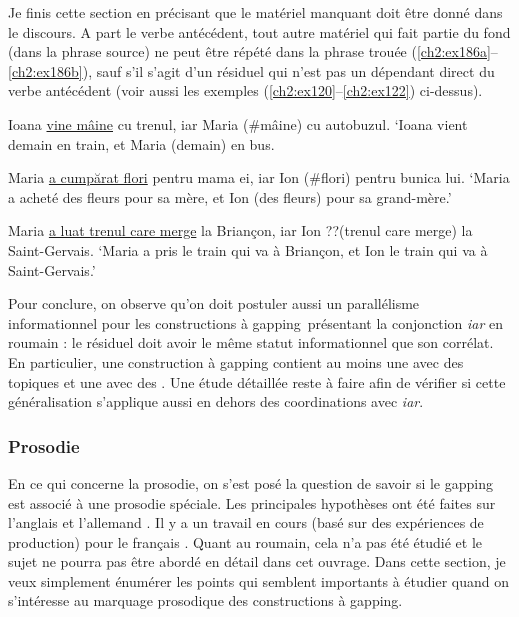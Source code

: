 Je finis cette section en précisant que le matériel manquant doit être donné dans le discours. A part le verbe antécédent, tout autre matériel qui fait partie du fond (dans la phrase source) ne peut être répété dans la phrase trouée (\ref{ch2:ex186a}--\ref{ch2:ex186b}), sauf s’il s’agit d’un résiduel qui n’est pas un dépendant direct du verbe antécédent  (voir aussi les exemples (\ref{ch2:ex120}--\ref{ch2:ex122}) ci-dessus). 

\ea
\ea Ioana \uline{vine mâine} cu trenul, iar Maria (\#mâine) cu autobuzul. \label{ch2:ex186a}
\glt ‘Ioana vient demain en train, et Maria (demain) en bus. 

\ex Maria \uline{a cumpărat flori} pentru mama ei, iar Ion (\#flori) pentru bunica lui. \label{ch2:ex186b} 
\glt ‘Maria a acheté des fleurs pour sa mère, et Ion (des fleurs) pour sa grand-mère.’

\ex Maria \uline{a luat trenul care merge} la Briançon, iar Ion ??(trenul care merge) la Saint-Gervais. \label{ch2:ex186c} 
\glt ‘Maria a pris le train qui va à Briançon, et Ion le train qui va à Saint-Gervais.’
\z
\z

Pour conclure, on observe qu’on doit postuler aussi un parallélisme informationnel pour les constructions à gapping~présentant la conjonction \textit{iar} en roumain : le résiduel doit avoir le même statut informationnel que son corrélat. En particulier, une construction à gapping contient au moins une  avec des topiques et une  avec des . Une étude détaillée reste à faire afin de vérifier si cette généralisation s’applique aussi en dehors des coordinations avec \textit{iar}.   


\subsubsection{Prosodie} \label{ch2:sect2.3.4.5}


En ce qui concerne la prosodie, on s’est posé la question de savoir si le gapping est associé à une prosodie spéciale. Les principales hypothèses ont été faites sur l’anglais et l’allemand \citep{Hartmann2000,Schwarz2000,Carlson2001,Carlson2002,FeryEtAl2005,Winkler2005}. Il y a un travail en cours (basé sur des expériences de production) pour le français \citep{AbeilleEtAlInPrep}. Quant au roumain, cela n’a pas été étudié et le sujet ne pourra pas être abordé en détail dans cet ouvrage. Dans cette section, je veux simplement énumérer les points qui semblent importants à étudier quand on s’intéresse au marquage prosodique des constructions à gapping.

